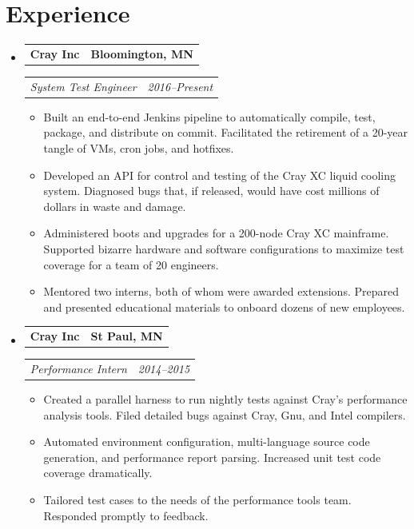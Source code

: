 \documentclass[11pt,letterpaper]{article}
\makeatletter
\newcommand{\headerrow}[2]{
    \begin{tabular*}{\linewidth}{l@{ \extracolsep{\fill} }r} #1 & #2
    \end{tabular*}
}
\newcommand{\YearRange}[2]{#1--#2}
\newcommand{\ResumeSection}[1]{
    \section*{ {\color{MidnightBlue}#1 \sout{\hfill} } }
}
\makeatother
\begin{document}


\ResumeSection{Experience}

\begin{itemize}[leftmargin=\parindent]
    \parskip=0.1em
    \itemsep=1.5em

    \item[]
        \headerrow{ \textbf{Cray Inc} }{ \textbf{Bloomington, MN} }
        \headerrow
            { \emph{System Test Engineer} }
            { \emph{ \YearRange{2016}{Present} } }
        \begin{itemize}
            \item Built an end-to-end Jenkins pipeline to automatically compile, test, package, and distribute on commit. Facilitated the retirement of a 20-year tangle of VMs, cron jobs, and hotfixes.
            \item Developed an API for control and testing of the Cray XC liquid cooling system. Diagnosed bugs that, if released, would have cost millions of dollars in waste and damage.
            \item Administered boots and upgrades for a 200-node Cray XC mainframe. Supported bizarre hardware and software configurations to maximize test coverage for a team of 20 engineers.
            \item Mentored two interns, both of whom were awarded extensions. Prepared and presented educational materials to onboard dozens of new employees.
        \end{itemize}

    \item[]
        \headerrow{ \textbf{Cray Inc} }{ \textbf{St Paul, MN} }
        \headerrow
            { \emph{Performance Intern} }
            { \emph{ \YearRange{2014}{2015} } }
        \begin{itemize}
            \item Created a parallel harness to run nightly tests against Cray's performance analysis tools. Filed detailed bugs against Cray, Gnu, and Intel compilers.
            \item Automated environment configuration, multi-language source code generation, and performance report parsing. Increased unit test code coverage dramatically.
            \item Tailored test cases to the needs of the performance tools team. Responded promptly to feedback.
        \end{itemize}


\end{itemize}
\end{document}
